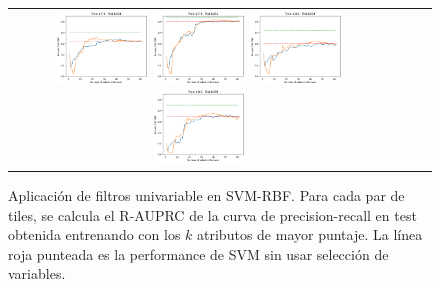 \begin{figure}[h!]
\begin{tabular}{cccc}
\includegraphics[width=0.25\textwidth]{Kap5/rbf_ALL_METHODS_train=b278test=b234}  \includegraphics[width=0.25\textwidth]{Kap5/rbf_ALL_METHODS_train=b278test=b261} 
 \includegraphics[width=0.25\textwidth]{Kap5/rbf_ALL_METHODS_train=b360test=b234}  \includegraphics[width=0.25\textwidth]{Kap5/rbf_ALL_METHODS_train=b360test=b278} 
\end{tabular}
\caption{Aplicación de filtros univariable en SVM-RBF. Para cada par de tiles, se calcula el R-AUPRC de la curva de precision-recall en test obtenida entrenando con los $k$ atributos de mayor puntaje. La línea roja punteada es la performance de SVM sin usar selección de variables.}
\label{fig:svmk_univariate}
\end{figure}

